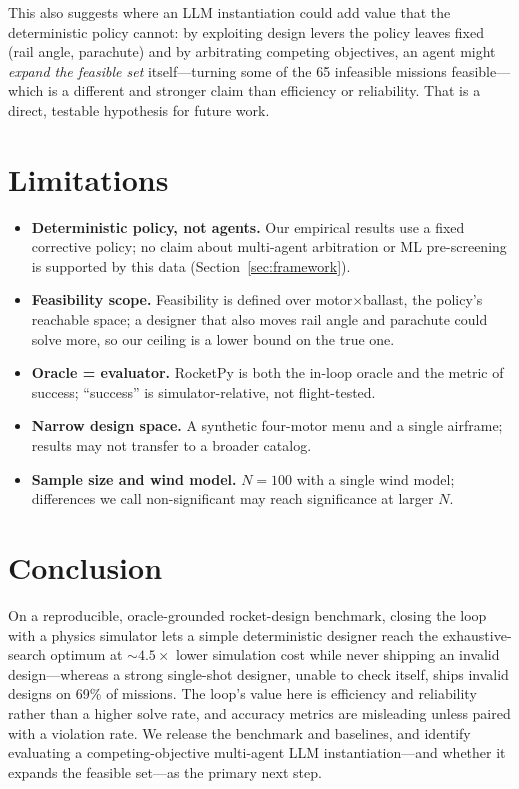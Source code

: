 \documentclass[11pt]{article}
\begin{document}
This also suggests where an LLM instantiation could add value that the
deterministic policy cannot: by exploiting design levers the policy leaves fixed
(rail angle, parachute) and by arbitrating competing objectives, an agent might
\emph{expand the feasible set} itself---turning some of the 65 infeasible
missions feasible---which is a different and stronger claim than efficiency or
reliability. That is a direct, testable hypothesis for future work.

\section{Limitations}

\begin{itemize}
  \item \textbf{Deterministic policy, not agents.} Our empirical results use a
  fixed corrective policy; no claim about multi-agent arbitration or ML
  pre-screening is supported by this data (Section~\ref{sec:framework}).
  \item \textbf{Feasibility scope.} Feasibility is defined over
  motor$\times$ballast, the policy's reachable space; a designer that also moves
  rail angle and parachute could solve more, so our ceiling is a lower bound on
  the true one.
  \item \textbf{Oracle = evaluator.} RocketPy is both the in-loop oracle and the
  metric of success; ``success'' is simulator-relative, not flight-tested.
  \item \textbf{Narrow design space.} A synthetic four-motor menu and a single
  airframe; results may not transfer to a broader catalog.
  \item \textbf{Sample size and wind model.} $N = 100$ with a single wind model;
  differences we call non-significant may reach significance at larger $N$.
\end{itemize}

\section{Conclusion}

On a reproducible, oracle-grounded rocket-design benchmark, closing the loop with
a physics simulator lets a simple deterministic designer reach the
exhaustive-search optimum at ${\sim}4.5\times$ lower simulation cost while never
shipping an invalid design---whereas a strong single-shot designer, unable to
check itself, ships invalid designs on 69\% of missions. The loop's value here is
efficiency and reliability rather than a higher solve rate, and accuracy metrics
are misleading unless paired with a violation rate. We release the benchmark and
baselines, and identify evaluating a competing-objective multi-agent LLM
instantiation---and whether it expands the feasible set---as the primary next
step.
\end{document}
